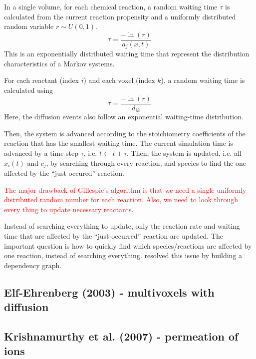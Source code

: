 In a single volume, for each chemical reaction, a random waiting time $\tau$
is calculated from the current reaction propensity and a uniformly distributed random variable
$r\sim U(0,1)$.
\begin{equation}
\tau = \frac{-\ln (r)}{a_j(x,t)}
\end{equation}
This is an exponentially distributed waiting time that represent the
distribution characteristics of a Markov systems. 

For each reactant (index $i$) and each voxel (index $k$), a random waiting time
is calculated using
\begin{equation}
\tau = \frac{-\ln(r)}{d_{ik}}
\end{equation}
Here, the diffusion events also follow an exponential waiting-time distribution. 


Then, the system is advanced according to the stoichiometry coefficients of 
the reaction that has the smallest waiting time. The current simulation time is
advanced by a time step $\tau$, i.e. $t \leftarrow t + \tau$. Then, the
system is updated, i.e. all $x_i(t)$ and $c_j$, by searching through every
reaction, and species to find the one affected by the ``just-occured'' reaction.

\begin{framed}
\textcolor{red}{The major drawback of Gillespie's algorithm is that we need a
single uniformly distributed random number for each reaction. Also, we need to
look through every thing to update necessary reactants}.

Instead of searching everything to update, only the reaction rate and waiting
time that are affected by the ``just-occurred'' reaction are updated. The important
question is how to quickly find which species/reactions are affected by one
reaction, instead of searching everything. \citep{gibson2000} resolved this
issue by building a dependency graph. 
\end{framed}


\subsection{Elf-Ehrenberg (2003) - multivoxels with diffusion}


\subsection{Krishnamurthy et al. (2007) - permeation of ions}
\label{sec:krishnamurthy_permeation}

